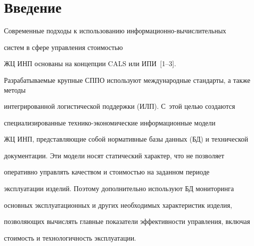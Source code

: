 














      \thispagestyle{headings}



\section{Введение}



     Современные подходы к использованию информационно-вычислительных

систем в сфере управления стоимостью

ЖЦ ИНП основаны на концепции CALS или ИПИ~[1--3].

Разрабатываемые крупные СППО используют международные стандарты, а также методы

интегрированной логистической поддержки (ИЛП). С~этой целью создаются

специализированные тех\-ни\-ко-эко\-но\-ми\-че\-ские информационные модели

ЖЦ ИНП, представляющие собой нормативные базы данных (БД) и технической

документации. Эти модели носят статический характер, что не позволяет

оперативно управлять качеством и стоимостью на заданном периоде

эксплуатации изделий. Поэтому дополнительно используют БД мониторинга

основных эксплуатационных и других необходимых характеристик изделия,

позволяющих вычислять главные показатели эффективности управления, включая

стоимость и технологичность эксплуатации.



